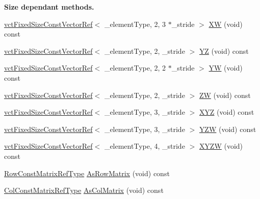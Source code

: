 \begin{Indent}{\bf Size dependant methods.}
\begin{DoxyCompactItemize}
\item 
\hyperlink{classvct_fixed_size_const_vector_ref}{vct\+Fixed\+Size\+Const\+Vector\+Ref}$<$ \+\_\+element\+Type, 2, 3 $\ast$\+\_\+stride $>$ \hyperlink{classvct_fixed_size_const_vector_base_aaaf0bfafb4c463a8e80529292c78263e}{X\+W} (void) const 
\item 
\hyperlink{classvct_fixed_size_const_vector_ref}{vct\+Fixed\+Size\+Const\+Vector\+Ref}$<$ \+\_\+element\+Type, 2, \+\_\+stride $>$ \hyperlink{classvct_fixed_size_const_vector_base_a3b919c98160f6d0b27d114155d24e5d1}{Y\+Z} (void) const 
\item 
\hyperlink{classvct_fixed_size_const_vector_ref}{vct\+Fixed\+Size\+Const\+Vector\+Ref}$<$ \+\_\+element\+Type, 2, 2 $\ast$\+\_\+stride $>$ \hyperlink{classvct_fixed_size_const_vector_base_ac1c376d6a306b27fb8cb655f0092d57f}{Y\+W} (void) const 
\item 
\hyperlink{classvct_fixed_size_const_vector_ref}{vct\+Fixed\+Size\+Const\+Vector\+Ref}$<$ \+\_\+element\+Type, 2, \+\_\+stride $>$ \hyperlink{classvct_fixed_size_const_vector_base_ae712b316e450452ba6603329c9418237}{Z\+W} (void) const 
\item 
\hyperlink{classvct_fixed_size_const_vector_ref}{vct\+Fixed\+Size\+Const\+Vector\+Ref}$<$ \+\_\+element\+Type, 3, \+\_\+stride $>$ \hyperlink{classvct_fixed_size_const_vector_base_ad3c02fe9042d5bb8b4a92e51bb3869da}{X\+Y\+Z} (void) const 
\item 
\hyperlink{classvct_fixed_size_const_vector_ref}{vct\+Fixed\+Size\+Const\+Vector\+Ref}$<$ \+\_\+element\+Type, 3, \+\_\+stride $>$ \hyperlink{classvct_fixed_size_const_vector_base_a4c6e3b73735612f6253cb1bbfa0a485f}{Y\+Z\+W} (void) const 
\item 
\hyperlink{classvct_fixed_size_const_vector_ref}{vct\+Fixed\+Size\+Const\+Vector\+Ref}$<$ \+\_\+element\+Type, 4, \+\_\+stride $>$ \hyperlink{classvct_fixed_size_const_vector_base_ae2b5ae2687bab88d80caf5becdd8a058}{X\+Y\+Z\+W} (void) const 
\end{DoxyCompactItemize}
\end{Indent}
{\bf }\par
\begin{DoxyCompactItemize}
\item 
\hyperlink{classvct_fixed_size_const_vector_base_ab7c118dbf79db9194157ced0e4549814}{Row\+Const\+Matrix\+Ref\+Type} \hyperlink{classvct_fixed_size_const_vector_base_aca37c653fd919f86d4c4950ea4ff1737}{As\+Row\+Matrix} (void) const 
\item 
\hyperlink{classvct_fixed_size_const_vector_base_a7dd213f3b90969b8c89fd0766cf0a70e}{Col\+Const\+Matrix\+Ref\+Type} \hyperlink{classvct_fixed_size_const_vector_base_ac13901448b8758b416bfa26d5deba10d}{As\+Col\+Matrix} (void) const 
\end{DoxyCompactItemize}

